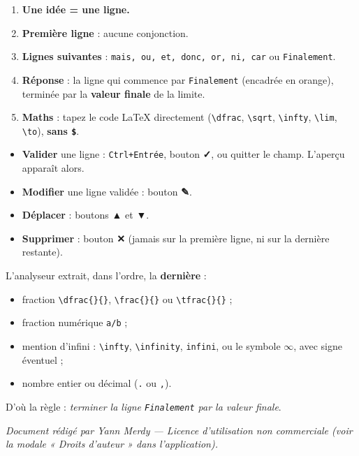 \documentclass[11pt,a4paper]{article}
\begin{document}
\begin{retenir}
\begin{enumerate}
  \item \textbf{Une idée = une ligne.}
  \item \textbf{Première ligne} : aucune conjonction.
  \item \textbf{Lignes suivantes} : \texttt{mais, ou, et, donc, or, ni, car}
        ou \texttt{Finalement}.
  \item \textbf{Réponse} : la ligne qui commence par \texttt{Finalement}
        (encadrée en orange), terminée par la \textbf{valeur finale} de la
        limite.
  \item \textbf{Maths} : tapez le code \LaTeX{} directement
        (\verb|\dfrac|, \verb|\sqrt|, \verb|\infty|, \verb|\lim|,
        \verb|\to|), \textbf{sans \texttt{\$}}.
\end{enumerate}
\end{retenir}

\begin{retenir}
\begin{itemize}
  \item \textbf{Valider} une ligne : \texttt{Ctrl+Entrée}, bouton
        \textbf{✓}, ou quitter le champ. L'aperçu apparaît alors.
  \item \textbf{Modifier} une ligne validée : bouton \textbf{✎}.
  \item \textbf{Déplacer} : boutons \textbf{▲} et \textbf{▼}.
  \item \textbf{Supprimer} : bouton \textbf{✕} (jamais sur la première ligne,
        ni sur la dernière restante).
\end{itemize}
\end{retenir}

\begin{retenir}
L'analyseur extrait, dans l'ordre, la \textbf{dernière} :
\begin{itemize}
  \item fraction \verb|\dfrac{}{}|, \verb|\frac{}{}| ou \verb|\tfrac{}{}| ;
  \item fraction numérique \verb|a/b| ;
  \item mention d'infini : \verb|\infty|, \verb|\infinity|, \verb|infini|,
        ou le symbole \(\infty\), avec signe éventuel ;
  \item nombre entier ou décimal (\texttt{.} ou \texttt{,}).
\end{itemize}
D'où la règle : \emph{terminer la ligne \texttt{Finalement} par la valeur
finale}.
\end{retenir}

\vfill
\begin{center}
\small\itshape
Document rédigé par Yann Merdy — Licence d'utilisation non commerciale
(voir la modale « Droits d'auteur » dans l'application).
\end{center}
\end{document}
